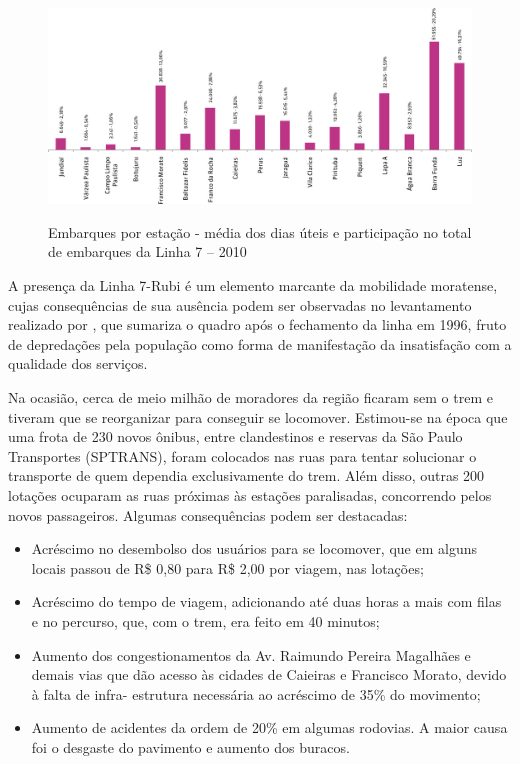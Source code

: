 	\begin{figure}[!htb]
		\centering
		\caption[Embarques por estação da Linha 7 - 2010]{Embarques por estação - média dos dias úteis e participação no total de embarques da Linha 7 – 2010}
		\includegraphics[width=\linewidth]{img/pdcptm_57a}
		\label{fig:pdcptm_57a}
	\end{figure}
    
    A presença da Linha 7-Rubi é um elemento marcante da mobilidade moratense, cujas consequências de sua ausência podem ser observadas no levantamento realizado por \cite[p.32-33]{ferreira2010a}, que sumariza o quadro após o fechamento da linha em 1996, fruto de depredações pela população como forma de manifestação da insatisfação com a qualidade dos serviços.
    
    \begin{citacao}
    	Na ocasião, cerca de meio milhão de moradores da região ficaram sem o trem e tiveram que se reorganizar para conseguir se locomover. Estimou-se na época que uma frota de 230 novos ônibus, entre clandestinos e reservas da São Paulo Transportes (SPTRANS), foram colocados nas ruas para tentar solucionar o transporte de quem dependia exclusivamente do trem. Além disso, outras 200 lotações ocuparam as ruas próximas às estações paralisadas, concorrendo pelos novos passageiros. Algumas consequências podem ser destacadas:
    	
    	\begin{itemize}[leftmargin=\leftskip+-]
    		\item Acréscimo no desembolso dos usuários para se locomover, que em alguns locais
    	passou de R\$ 0,80 para R\$ 2,00 por viagem, nas lotações;
	    	\item Acréscimo do tempo de viagem, adicionando até duas horas a mais com filas e no
    	percurso, que, com o trem, era feito em 40 minutos;
	    	\item Aumento dos congestionamentos da Av. Raimundo Pereira Magalhães e demais vias
    	que dão acesso às cidades de Caieiras e Francisco Morato, devido à falta de infra-
    	estrutura necessária ao acréscimo de 35\% do movimento;
		    \item Aumento de acidentes da ordem de 20\% em algumas rodovias. A maior causa foi o
    	desgaste do pavimento e aumento dos buracos.
		\end{itemize}
    \end{citacao}
    
